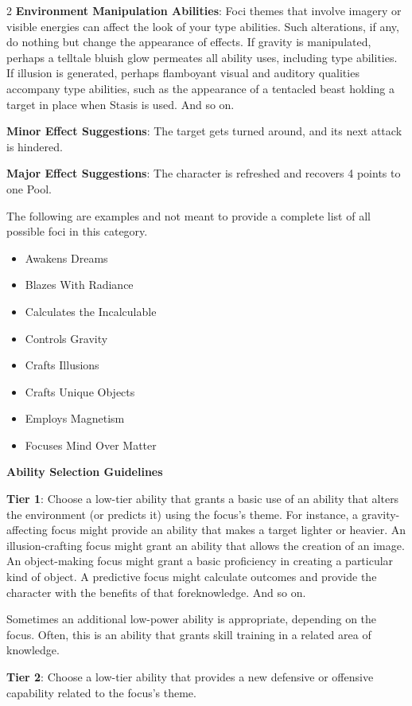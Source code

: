 \begin{multicols}{2}
\textbf{Environment Manipulation Abilities}: Foci themes that involve imagery or visible energies can affect the look of your type abilities. Such alterations, if any, do nothing but change the appearance of effects. If gravity is manipulated, perhaps a telltale bluish glow permeates all ability uses, including type abilities. If illusion is generated, perhaps flamboyant visual and auditory qualities accompany type abilities, such as the appearance of a tentacled beast holding a target in place when Stasis is used. And so on.

\textbf{Minor Effect Suggestions}: The target gets turned around, and its next attack is hindered.

\textbf{Major Effect Suggestions}: The character is refreshed and recovers 4 points to one Pool.

The following are examples and not meant to provide a complete list of all possible foci in this category.

\begin{itemize} 
\item Awakens Dreams
\item Blazes With Radiance
\item Calculates the Incalculable
\item Controls Gravity
\item Crafts Illusions
\item Crafts Unique Objects
\item Employs Magnetism
\item Focuses Mind Over Matter
\end{itemize}

\textbf{Ability Selection Guidelines}

\textbf{Tier 1}: Choose a low-tier ability that grants a basic use of an ability that alters the environment (or predicts it) using the focus’s theme. For instance, a gravity-affecting focus might provide an ability that makes a target lighter or heavier. An illusion-crafting focus might grant an ability that allows the creation of an image. An object-making focus might grant a basic proficiency in creating a particular kind of object. A predictive focus might calculate outcomes and provide the character with the benefits of that foreknowledge. And so on.

Sometimes an additional low-power ability is appropriate, depending on the focus. Often, this is an ability that grants skill training in a related area of knowledge.

\textbf{Tier 2}: Choose a low-tier ability that provides a new defensive or offensive capability related to the focus’s theme. 


\end{multicols}
